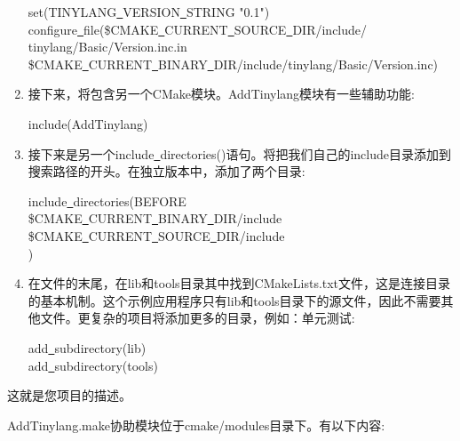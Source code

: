 \begin{enumerate}
 	\begin{tcolorbox}[colback=white,colframe=black]
 		set(TINYLANG\underline{~}VERSION\underline{~}STRING "0.1") \\
 		configure\underline{~}file(\${CMAKE\underline{~}CURRENT\underline{~}SOURCE\underline{~}DIR}/include/ \\
 		tinylang/Basic/Version.inc.in \\
 		  \${CMAKE\underline{~}CURRENT\underline{~}BINARY\underline{~}DIR}/include/tinylang/Basic/Version.inc)
 	\end{tcolorbox}
 	\item 接下来，将包含另一个CMake模块。AddTinylang模块有一些辅助功能:
 	\begin{tcolorbox}[colback=white,colframe=black]
 		include(AddTinylang)
 	\end{tcolorbox}
 	\item 接下来是另一个include\underline{~}directories()语句。将把我们自己的include目录添加到搜索路径的开头。在独立版本中，添加了两个目录:
 	\begin{tcolorbox}[colback=white,colframe=black]
 		include\underline{~}directories(BEFORE \\
 		\${CMAKE\underline{~}CURRENT\underline{~}BINARY\underline{~}DIR}/include \\
 		\${CMAKE\underline{~}CURRENT\underline{~}SOURCE\underline{~}DIR}/include \\
 		)
 	\end{tcolorbox}
 	\item 在文件的末尾，在lib和tools目录其中找到CMakeLists.txt文件，这是连接目录的基本机制。这个示例应用程序只有lib和tools目录下的源文件，因此不需要其他文件。更复杂的项目将添加更多的目录，例如：单元测试:
 	\begin{tcolorbox}[colback=white,colframe=black]
 		add\underline{~}subdirectory(lib) \\
 		add\underline{~}subdirectory(tools)
 	\end{tcolorbox}
\end{enumerate}

这就是您项目的描述。\par

AddTinylang.make协助模块位于cmake/modules目录下。有以下内容:\par

